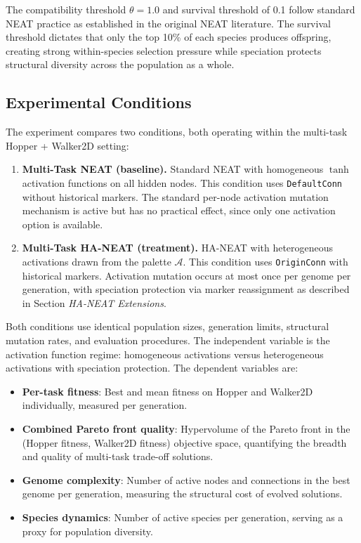 \documentclass[12pt]{article}
\begin{document}
The compatibility threshold $\theta = 1.0$ and survival threshold of 0.1 follow standard NEAT practice as established in the original NEAT literature. The survival threshold dictates that only the top 10\% of each species produces offspring, creating strong within-species selection pressure while speciation protects structural diversity across the population as a whole.

\subsection{Experimental Conditions}

The experiment compares two conditions, both operating within the multi-task Hopper + Walker2D setting:

\begin{enumerate}
    \item \textbf{Multi-Task NEAT (baseline).} Standard NEAT with homogeneous $\tanh$ activation functions on all hidden nodes. This condition uses \texttt{DefaultConn} without historical markers. The standard per-node activation mutation mechanism is active but has no practical effect, since only one activation option is available.
    
    \item \textbf{Multi-Task HA-NEAT (treatment).} HA-NEAT with heterogeneous activations drawn from the palette $\mathcal{A}$. This condition uses \texttt{OriginConn} with historical markers. Activation mutation occurs at most once per genome per generation, with speciation protection via marker reassignment as described in Section \textit{HA-NEAT Extensions}.
\end{enumerate}

Both conditions use identical population sizes, generation limits, structural mutation rates, and evaluation procedures. The independent variable is the activation function regime: homogeneous activations versus heterogeneous activations with speciation protection. The dependent variables are:

\begin{itemize}
    \item \textbf{Per-task fitness}: Best and mean fitness on Hopper and Walker2D individually, measured per generation.
    \item \textbf{Combined Pareto front quality}: Hypervolume of the Pareto front in the (Hopper fitness, Walker2D fitness) objective space, quantifying the breadth and quality of multi-task trade-off solutions.
    \item \textbf{Genome complexity}: Number of active nodes and connections in the best genome per generation, measuring the structural cost of evolved solutions.
    \item \textbf{Species dynamics}: Number of active species per generation, serving as a proxy for population diversity.
\end{itemize}
\end{document}
